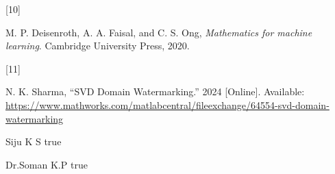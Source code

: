 \documentclass[
  journal,
]{IEEEtran}%
\newlength{\cslhangindent}
\newlength{\csllabelwidth}
\newenvironment{CSLReferences}[2] %
 {\begin{list}{}{%
  \setlength{\itemindent}{0pt}
  \setlength{\leftmargin}{0pt}
  \setlength{\parsep}{0pt}
  \ifodd #1
   \setlength{\leftmargin}{\cslhangindent}
   \setlength{\itemindent}{-1\cslhangindent}
  \fi
  \setlength{\itemsep}{#2\baselineskip}}}
 {\end{list}}
\newcommand{\CSLLeftMargin}[1]{\parbox[t]{\csllabelwidth}{\strut#1\strut}}
\newcommand{\CSLRightInline}[1]{\parbox[t]{\linewidth - \csllabelwidth}{\strut#1\strut}}
\providecommand{\bibfont}{\footnotesize}
\begin{document}
\begin{CSLReferences}{0}{0}
\CSLLeftMargin{{[}10{]} }%
\CSLRightInline{M. P. Deisenroth, A. A. Faisal, and C. S. Ong,
\emph{Mathematics for machine learning}. Cambridge University Press,
2020. }

\CSLLeftMargin{{[}11{]} }%
\CSLRightInline{N. K. Sharma, {``{SVD Domain Watermarking}.''} 2024
{[}Online{]}. Available:
\url{https://www.mathworks.com/matlabcentral/fileexchange/64554-svd-domain-watermarking}}

\end{CSLReferences}


\ifCLASSOPTIONcaptionsoff
  \newpage
\fi



\pagebreak[3]
\begin{IEEEbiography}{Siju K S}
true
\end{IEEEbiography}
\begin{IEEEbiography}{Dr.Soman K.P}
true
\end{IEEEbiography}
\end{document}
